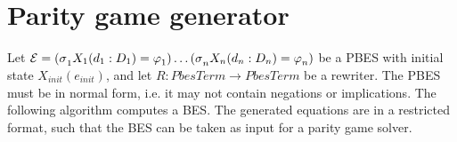                       

\section{Parity game generator}

Let $\mathcal{E=(\sigma }_{1}X_{1}(d_{1}:D_{1})=\varphi _{1})\ldots \mathcal{%
(\sigma }_{n}X_{n}(d_{n}:D_{n})=\varphi _{n})$ be a PBES with initial state $%
X_{init}(e_{init})$, and let $R:PbesTerm\rightarrow PbesTerm$ be a rewriter.
The PBES must be in normal form, i.e. it may not contain negations or
implications. The following algorithm computes a BES. The generated
equations are in a restricted format, such that the BES can be taken as
input for a parity game solver.

